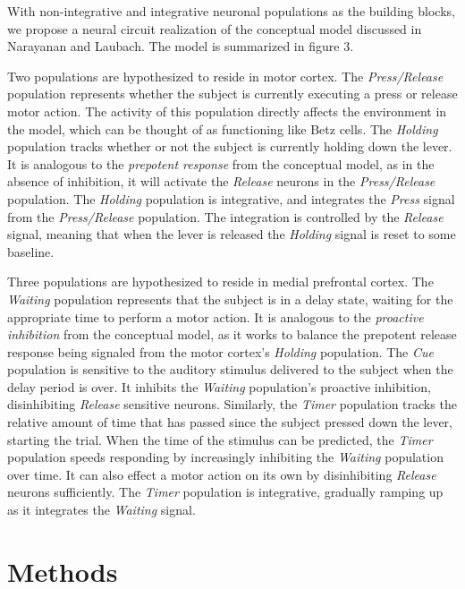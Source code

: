 \documentclass[12pt]{article}
\begin{document}
With non-integrative and integrative neuronal populations
as the building blocks, we propose a neural circuit
realization of the conceptual model
discussed in Narayanan and Laubach.
The model is summarized in figure 3.

Two populations are hypothesized to reside in motor cortex.
The \textit{Press/Release} population represents
whether the subject is currently executing
a press or release motor action.
The activity of this population directly affects the environment
in the model, which can be thought of
as functioning like Betz cells.
The \textit{Holding} population tracks
whether or not the subject is currently holding down the lever.
It is analogous to the \textit{prepotent response}
from the conceptual model, as in the absence of inhibition,
it will activate the \textit{Release} neurons
in the \textit{Press/Release} population.
The \textit{Holding} population is integrative,
and integrates the
\textit{Press} signal from the \textit{Press/Release}
population. The integration is controlled
by the \textit{Release} signal, meaning that
when the lever is released the \textit{Holding} signal
is reset to some baseline.

Three populations are hypothesized to reside
in medial prefrontal cortex.
The \textit{Waiting} population represents
that the subject is in a delay state,
waiting for the appropriate time to perform a motor action.
It is analogous to the \textit{proactive inhibition}
from the conceptual model, as it works to balance
the prepotent release response being signaled
from the motor cortex's \textit{Holding} population.
The \textit{Cue} population is sensitive
to the auditory stimulus delivered to the subject
when the delay period is over.
It inhibits the \textit{Waiting} population's
proactive inhibition, disinhibiting \textit{Release}
sensitive neurons.
Similarly, the \textit{Timer} population
tracks the relative amount of time that has passed
since the subject pressed down the lever,
starting the trial.
When the time of the stimulus can be predicted,
the \textit{Timer} population speeds
responding by increasingly inhibiting the
\textit{Waiting} population over time.
It can also effect a motor action on its own by
disinhibiting \textit{Release} neurons sufficiently.
The \textit{Timer} population is integrative,
gradually ramping up as it integrates
the \textit{Waiting} signal.

\section{Methods}
\end{document}
